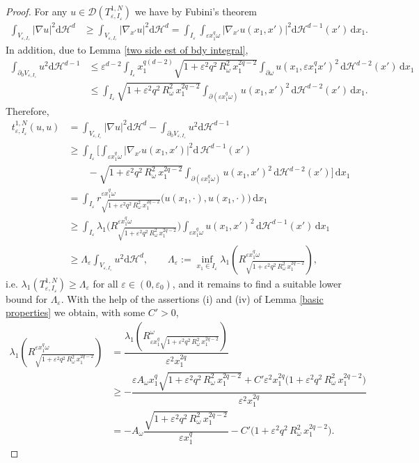 \documentclass[11pt,oneside,reqno,a4paper]{amsart}
\newcommand{\dd}{\mathrm{d}}
\newcommand{\cD}{\mathcal{D}}
\renewcommand{\H}{\mathcal{H}}
\newcommand{\eps}{\varepsilon}
\theoremstyle{definition}
\begin{document}
\begin{proof}
For any $u\in\cD(T^{1,N}_{\eps,I_\eps})$ we have by Fubini's theorem
\begin{align*}
	\int_{V_{\eps,I_\eps}} |\nabla u|^2\dd \H^d&\ge \int_{V_{\eps,I_\eps}} |\nabla_{x'} u|^2\dd \H^d=\int_{I_\eps} \int_{\eps x_1^q \omega} \big|\nabla_{x'}u(x_1,x')\big|^2\dd \H^{d-1}(x')\,\dd x_1.
\end{align*}	
In addition, due to Lemma \ref{two side est of bdy integral},	
\begin{align*}
	\int_{\partial_0 V_{\eps,I_\eps}}u^2\dd\H^{d-1}
	&\le \eps^{d-2}\int_{I_\eps}
	x_1^{q(d-2)}\sqrt{1+\eps^2q^2\,R_\omega^2\,x_1^{2q-2}}\int_{\partial\omega}u(x_1,\eps x_1^q x')^2\,\dd\H^{d-2}(x')\,\dd x_1\\
	&\le \int_{I_\eps}\sqrt{1+\eps^2q^2\,R_\omega^2\,x_1^{2q-2}}
	\int_{\partial(\eps x_1^q\omega)}u(x_1,x')^2\,\dd\H^{d-2}(x')\,\dd x_1.
\end{align*}
Therefore,
\begin{align*}
	t^{1,N}_{\eps,I_\eps}(u,u)&=\int_{V_{\eps,I_\eps}} |\nabla u|^2\dd \H^d-\int_{\partial_0 V_{\eps,I_\eps}}u^2\dd\H^{d-1}\\
	&\ge \int_{I_\eps}\Big[ \int_{\eps x_1^q \omega} \big|\nabla_{x'}u(x_1,x')\big|^2\dd\,\H^{d-1}(x')\\
	&\qquad-
	\sqrt{1+\eps^2q^2\,R_\omega^2\,x_1^{2q-2}}
	\int_{\partial(\eps x_1^q\omega)}u(x_1,x')^2\,\dd\H^{d-2}(x')\Big]\,\dd x_1\\
	&=\int_{I_\eps} r^{\eps x_1^q \omega}_{\sqrt{1+\eps^2q^2\,R_\omega^2\,x_1^{2q-2}}}\big(u(x_1,\cdot),u(x_1,\cdot)\big)\,\dd x_1\\
	&\ge \int_{I_\eps} \lambda_1\Big(R^{\eps x_1^q \omega}_{\sqrt{1+\eps^2q^2\,R_\omega^2\,x_1^{2q-2}}}\Big) \int_{\eps x_1^q \omega}u(x_1,x')^2\,\dd\H^{d-1}(x')\,\dd x_1\\
	&\ge \Lambda_\eps \int_{V_{\eps,I_\eps}}u^2\dd\H^d,\qquad
\Lambda_\eps:=\inf_{x_1\in I_\eps} \lambda_1\left(R^{\eps x_1^q \omega}_{\sqrt{1+\eps^2q^2\,R_\omega^2\,x_1^{2q-2}}}\right),
\end{align*}
i.e. $\lambda_1(T^{1,N}_{\eps,I_\eps})\ge \Lambda_\eps$ for all $\eps\in(0,\eps_0)$,
and it remains to find a suitable lower bound for $\Lambda_\eps$.
With the help of the assertions (i) and (iv) of Lemma \ref{basic properties} we obtain, with some $C'>0$,
\begin{align*}
\lambda_1\left(R^{\eps x_1^q \omega}_{\sqrt{1+\eps^2q^2\,R_\omega^2\,x_1^{2q-2}}}\right)&=\dfrac{\lambda_1\left(R^{\omega}_{\eps x_1^q\sqrt{1+\eps^2q^2\,R_\omega^2\,x_1^{2q-2}}}\right)}{\eps^2x_1^{2q}}\\
&\ge -\dfrac{
	\eps A_\omega  x_1^q\sqrt{1+\eps^2q^2\,R_\omega^2\,x_1^{2q-2}}
	+C' \eps^2 x_1^{2q} \big(1+\eps^2q^2\,R_\omega^2\,x_1^{2q-2}\big)
	}{\eps^2 x_1^{2q}}\\
	&= -A_\omega \dfrac{\sqrt{1+\eps^2q^2\,R_\omega^2\,x_1^{2q-2}}}{\eps x_1^q}
	-C' \big(1+\eps^2q^2\,R_\omega^2\,x_1^{2q-2}\big).
\end{align*}



\end{proof}
\end{document}
